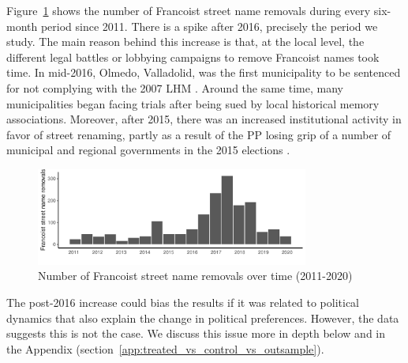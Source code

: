 \documentclass[12pt, notitlepage]{article}
\begin{document}
Figure~\ref{fig:changes_time} shows the number of Francoist street name removals during every six-month period since 2011. There is a spike after 2016, precisely the period we study. The main reason behind this increase is that, at the local level, the different legal battles or lobbying campaigns to remove Francoist names took time.
In mid-2016, Olmedo, Valladolid, was the first municipality to be sentenced for not complying with the 2007 LHM \citep{El-Norte-de-Castilla:2016aa}.
Around the same time, many municipalities began facing trials after being sued by local historical memory associations.
Moreover, after 2015, there was an increased institutional activity in favor of street renaming, partly as a result of the PP losing grip of a number of municipal and regional governments in the 2015 elections \citep[e.g.][]{Vazquez:2016aa, El-Comercio:2016ab}.

\begin{figure}[htb!]
\centering

  \includegraphics[width = 0.8\textwidth]{img/changes_by_year}

  \caption{Number of Francoist street name removals over time (2011-2020)}\label{fig:changes_time}

  \vspace{5pt}


\end{figure}

The post-2016 increase could bias the results if it was related to political dynamics that also explain the change in political preferences.
However, the data suggests this is not the case.
We discuss this issue more in depth below and in the Appendix (section~\ref{app:treated_vs_control_vs_outsample}).
\end{document}
